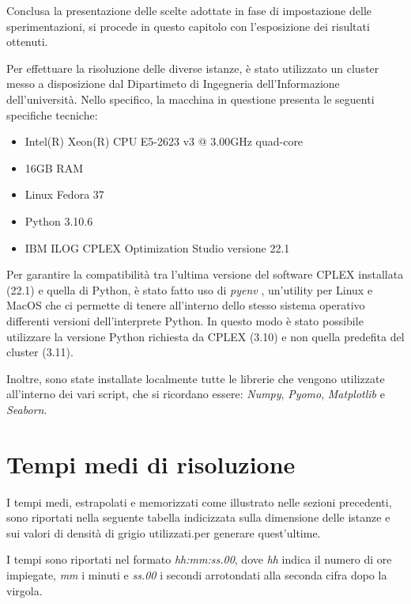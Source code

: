 Conclusa la presentazione delle scelte adottate in fase di impostazione delle sperimentazioni, 
si procede in questo capitolo con l'esposizione dei risultati ottenuti. 

Per effettuare la risoluzione delle diverse istanze, è stato utilizzato un cluster messo a disposizione dal Dipartimeto di Ingegneria dell'Informazione 
dell'università. Nello specifico, la macchina in questione presenta le seguenti specifiche tecniche:
\begin{itemize}
\item Intel(R) Xeon(R) CPU E5-2623 v3 @ 3.00GHz quad-core
\item 16GB RAM
\item Linux Fedora 37
\item Python 3.10.6
\item IBM ILOG CPLEX Optimization Studio versione 22.1
\end{itemize}
Per garantire la compatibilità tra l'ultima versione del software CPLEX installata (22.1) e quella di Python, è stato fatto uso di \textit{pyenv} \cite{pyenv}, 
un'utility per Linux e MacOS che ci permette di tenere all'interno dello stesso sistema operativo differenti versioni dell'interprete Python. In questo modo 
è stato possibile utilizzare la versione Python richiesta da CPLEX (3.10) e non quella predefita del cluster (3.11).

Inoltre, sono state installate localmente tutte le librerie che vengono utilizzate all'interno dei vari script, che si ricordano 
essere: \textit{Numpy}, \textit{Pyomo}, \textit{Matplotlib} e \textit{Seaborn}.

\newpage
\section{Tempi medi di risoluzione}
I tempi medi, estrapolati e memorizzati come illustrato nelle sezioni precedenti, sono riportati nella seguente tabella indicizzata sulla dimensione delle istanze 
e sui valori di densità di grigio utilizzati.per generare quest'ultime.

I tempi sono riportati nel formato \textit{hh:mm:ss.00}, dove \textit{hh} indica il numero di ore impiegate, \textit{mm} i minuti e \textit{ss.00} i secondi arrotondati 
alla seconda cifra dopo la virgola. \\

